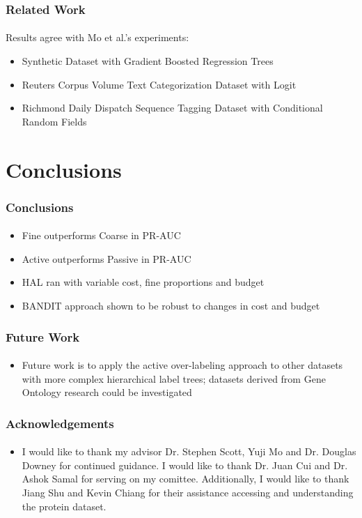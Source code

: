 \documentclass{beamer}
\begin{document}
\begin{frame}
    \frametitle{Related Work}  %
    \framesubtitle{}
    \par Results agree with Mo et al.'s experiments:
    \begin{itemize}
      \item Synthetic Dataset with Gradient Boosted Regression Trees
      \item Reuters Corpus Volume Text Categorization Dataset with Logit
      \item Richmond Daily Dispatch Sequence Tagging Dataset with Conditional Random Fields
    \end{itemize}
\end{frame}




\section{Conclusions}
\begin{frame}
    \frametitle{Conclusions}  %
    \framesubtitle{}
    \begin{itemize}
    \item Fine outperforms Coarse in PR-AUC
    \item Active outperforms Passive in PR-AUC
    \item HAL ran with variable cost, fine proportions and budget
    \item BANDIT approach shown to be robust to changes in cost and budget
    \end{itemize}
\end{frame}
\begin{frame}
    \frametitle{Future Work}  %
    \framesubtitle{}
    \begin{itemize}
      \item Future work is to apply the active over-labeling approach
      to other datasets with more complex hierarchical label trees;
      datasets derived from Gene Ontology research could be investigated
    \end{itemize}
\end{frame}
\begin{frame}
    \frametitle{Acknowledgements}
    \framesubtitle{}
    \begin{itemize}
      \item I would like to thank my advisor Dr. Stephen Scott,
      Yuji Mo and Dr. Douglas Downey for continued guidance. I would like to
      thank Dr. Juan Cui and Dr. Ashok Samal for serving on my comittee. Additionally,
      I would like to thank Jiang Shu and Kevin Chiang for their
      assistance accessing and understanding the protein dataset.
    \end{itemize}
\end{frame}
\end{document}
